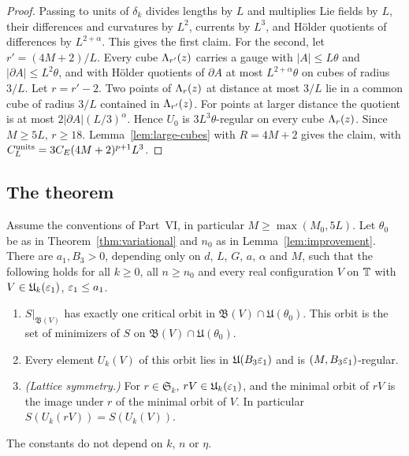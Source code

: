 \begin{proof}
Passing to units of $\delta_k$ divides lengths by $L$ and multiplies Lie fields by $L$, their differences and curvatures by $L^2$, currents by $L^3$, and H\"older quotients of differences by $L^{2+\alpha}$. This gives the first claim. For the second, let $r'=(4M+2)/L$. Every cube $\Lambda_{r'}(z)$ carries a gauge with $|A|\le L\theta$ and $|\partial A|\le L^2\theta$, and with H\"older quotients of $\partial A$ at most $L^{2+\alpha}\theta$ on cubes of radius $3/L$. Let $r=r'-2$. Two points of $\Lambda_r(z)$ at distance at most $3/L$ lie in a common cube of radius $3/L$ contained in $\Lambda_{r'}(z)$. For points at larger distance the quotient is at most $2|\partial A|(L/3)^\alpha$. Hence $U_0$ is $3L^3\theta$-regular on every cube $\Lambda_r(z)$. Since $M\ge5L$, $r\ge18$. Lemma~\ref{lem:large-cubes} with $R=4M+2$ gives the claim, with $C^{\rm units}_L=3C_E(4M+2)^{p+1}L^3$.
\end{proof}

\subsection{The theorem}\label{ss:30.3}

\begin{theorem}\label{thm:balaban}
Assume the conventions of Part~VI, in particular $M\ge\max(M_0,5L)$. Let $\theta_0$ be as in Theorem~\ref{thm:variational} and $n_0$ as in Lemma~\ref{lem:improvement}. There are $a_1,B_3>0$, depending only on $d$, $L$, $G$, $a$, $\alpha$ and $M$, such that the following holds for all $k\ge0$, all $n\ge n_0$ and every real configuration $V$ on $\mathbb T$ with $V\in\mathfrak U_k(\varepsilon_1)$, $\varepsilon_1\le a_1$.
\begin{enumerate}[label=(\alph*)]
\item $S|_{\mathfrak B(V)}$ has exactly one critical orbit in $\mathfrak B(V)\cap\mathfrak U(\theta_0)$. This orbit is the set of minimizers of $S$ on $\mathfrak B(V)\cap\mathfrak U(\theta_0)$.
\item Every element $U_k(V)$ of this orbit lies in $\mathfrak U(B_3\varepsilon_1)$ and is $(M,B_3\varepsilon_1)$-regular.
\item \emph{(Lattice symmetry.)} For $r\in\mathfrak S_k$, $rV\in\mathfrak U_k(\varepsilon_1)$, and the minimal orbit of $rV$ is the image under $r$ of the minimal orbit of $V$. In particular $S(U_k(rV))=S(U_k(V))$.
\end{enumerate}
The constants do not depend on $k$, $n$ or $\eta$.
\end{theorem}

